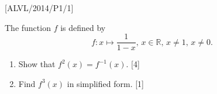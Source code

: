 \item {[}ALVL/2014/P1/1{]}

The function $f$ is defined by 
\[
f:x\mapsto\frac{1}{1-x},\,x\in\mathbb{R},\,x\neq1,\,x\neq0.
\]

\begin{enumerate}
\item Show that $f^{2}\left(x\right)=f^{-1}\left(x\right)$. \hfill{}{[}4{]}
\item Find $f^{3}\left(x\right)$ in simplified form. \hfill{}{[}1{]}
\end{enumerate}
